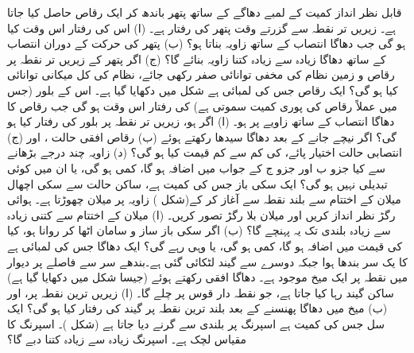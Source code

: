 قابل نظر انداز کمیت کے  لمبے دھاگے  کے ساتھ     پتھر باندھ  کر ایک رقاص حاصل کیا جاتا ہے۔ زیریں تر نقطہ سے گزرتے وقت پتھر کی رفتار  ہے۔ (ا)  اس کی رفتار اس وقت کیا ہو گی جب دھاگا انتصاب کے ساتھ  زاویہ بناتا ہو؟  (ب)   پتھر کی حرکت کے دوران  انتصاب کے ساتھ دھاگا زیادہ سے زیادہ کتنا زاویہ بنائے گا؟ (ج)  اگر  پتھر کے  زیریں تر نقطہ  پر رقاص و زمین نظام کی مخفی توانائی صفر  رکھی جائے، نظام کی کل میکانی توانائی کیا ہو گی؟
ایک رقاص جس کی لمبائی  ہے شکل  میں دکھایا گیا ہے۔  اس کے بلور (جس میں  عملاً رقاص کی پوری کمیت   سموتی ہے) کی رفتار اس وقت  ہو گی جب  رقاص کا دھاگا انتصاب کے ساتھ  زاویے پر ہو۔ (ا) اگر  ہو، زیریں تر نقطہ پر بلور کی رفتار کیا ہو گی؟    اگر  نیچے جانے کے بعد  دھاگا  سیدھا رکھتے ہوئے   (ب) رقاص   افقی حالت  ، اور (ج) انتصابی حالت اختیار  پائے،   کی کم سے کم قیمت کیا ہو گی؟  (د)  زاویہ  چند درجے بڑھانے سے کیا جزو ب اور جزو ج کے جواب میں اضافہ ہو گا، کمی ہو گی، یا ان میں کوئی تبدیلی نہیں ہو گی؟
ایک  سکی باز  جس کی کمیت  ہے، ساکن حالت سے  سکی  اچھال میلان کے اختتام   سے  بلند نقطہ سے آغاز کر کے(شکل )  زاویہ  پر میلان چھوڑتا ہے۔ ہوائی رگڑ نظر انداز  کریں اور  میلان بلا رگڑ تصور کریں۔ (ا)  میلان کے اختتام سے کتنی زیادہ سے زیادہ  بلندی   تک  یہ پہنچے گا؟ (ب)  اگر سکی باز   ساز و   سامان  اٹھا کر روانا ہو، کیا  کی قیمت میں اضافہ ہو گا، کمی ہو گی، یا وہی رہے گی؟
ایک دھاگا جس کی لمبائی  ہے کا یک سر بندھا ہوا  جبکہ دوسرے  سے گیند لٹکائی گئی ہے۔بندھے سر  سے  فاصلے پر  دیوار میں نقطہ  پر    ایک  میخ موجود ہے۔   دھاگا افقی رکھتے ہوئے (جیسا شکل  میں دکھایا گیا ہے) ساکن گیند رہا  کیا جاتا ہے، جو نقطہ دار قوس پر چلے گا۔ (ا) زیریں ترین نقطہ پر، اور (ب) میخ میں دھاگا  پھنسنے کے بعد بلند ترین نقطہ پر گیند کی رفتار کیا ہو گی؟
ایک سل جس کی کمیت  ہے اسپرنگ پر  بلندی سے گرنے دیا جاتا ہے (شکل )۔ اسپرنگ کا مقیاس لچک  ہے۔ اسپرنگ زیادہ سے زیادہ کتنا دبے گا؟
